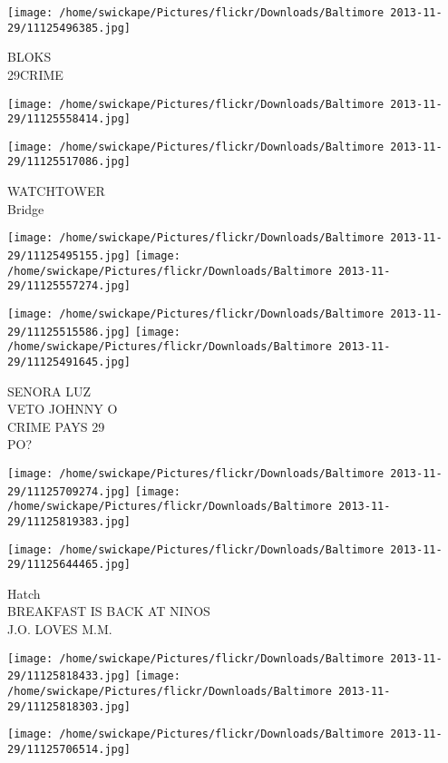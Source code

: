 \documentclass[10pt,letterpaper]{article}
\begin{document}
\vspace{0.25in}
\texttt{[image: /home/swickape/Pictures/flickr/Downloads/Baltimore 2013-11-29/11125496385.jpg]}

BLOKS\\
29CRIME
\pagebreak

\texttt{[image: /home/swickape/Pictures/flickr/Downloads/Baltimore 2013-11-29/11125558414.jpg]}

\vspace{0.25in}
\texttt{[image: /home/swickape/Pictures/flickr/Downloads/Baltimore 2013-11-29/11125517086.jpg]}

WATCHTOWER\\
Bridge
\pagebreak

\texttt{[image: /home/swickape/Pictures/flickr/Downloads/Baltimore 2013-11-29/11125495155.jpg]}
\texttt{[image: /home/swickape/Pictures/flickr/Downloads/Baltimore 2013-11-29/11125557274.jpg]}

\texttt{[image: /home/swickape/Pictures/flickr/Downloads/Baltimore 2013-11-29/11125515586.jpg]}
\texttt{[image: /home/swickape/Pictures/flickr/Downloads/Baltimore 2013-11-29/11125491645.jpg]}

SENORA LUZ\\
VETO JOHNNY O\\
CRIME PAYS 29\\
PO?
\pagebreak

\texttt{[image: /home/swickape/Pictures/flickr/Downloads/Baltimore 2013-11-29/11125709274.jpg]}
\texttt{[image: /home/swickape/Pictures/flickr/Downloads/Baltimore 2013-11-29/11125819383.jpg]}

\vspace{0.25in}
\texttt{[image: /home/swickape/Pictures/flickr/Downloads/Baltimore 2013-11-29/11125644465.jpg]}

Hatch\\
BREAKFAST IS BACK AT NINOS\\
J.O. LOVES M.M.
\pagebreak

\texttt{[image: /home/swickape/Pictures/flickr/Downloads/Baltimore 2013-11-29/11125818433.jpg]}
\texttt{[image: /home/swickape/Pictures/flickr/Downloads/Baltimore 2013-11-29/11125818303.jpg]}

\vspace{0.25in}
\texttt{[image: /home/swickape/Pictures/flickr/Downloads/Baltimore 2013-11-29/11125706514.jpg]}
\end{document}
